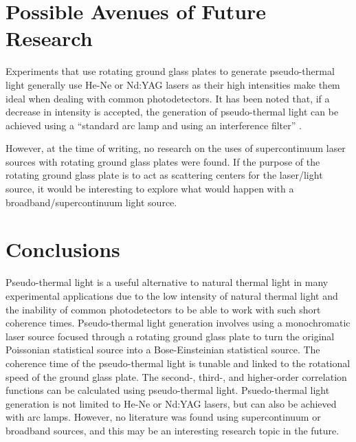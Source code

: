 \documentclass{article}
\begin{document}
\section{Possible Avenues of Future Research}

Experiments that use rotating ground glass plates to generate pseudo-thermal light generally use He-Ne or Nd:YAG lasers as their high intensities make them ideal when dealing with common photodetectors. It has been noted that, if a decrease in intensity is accepted, the generation of pseudo-thermal light can be achieved using a ``standard arc lamp and using an interference filter'' \cite{Spiller2014}.

However, at the time of writing, no research on the uses of supercontinuum laser sources with rotating ground glass plates were found. If the purpose of the rotating ground glass plate is to act as scattering centers for the laser/light source, it would be interesting to explore what would happen with a broadband/supercontinuum light source.

\section{Conclusions}

Pseudo-thermal light is a useful alternative to natural thermal light in many experimental applications due to the low intensity of natural thermal light and the inability of common photodetectors to be able to work with such short coherence times. Pseudo-thermal light generation involves using a monochromatic laser source focused through a rotating ground glass plate to turn the original Poissonian statistical source into a Bose-Einsteinian statistical source. The coherence time of the pseudo-thermal light is tunable and linked to the rotational speed of the ground glass plate. The second-, third-, and higher-order correlation functions can be calculated using pseudo-thermal light. Psuedo-thermal light generation is not limited to He-Ne or Nd:YAG lasers, but can also be achieved with arc lamps. However, no literature was found using supercontinuum or broadband sources, and this may be an interesting research topic in the future.
\end{document}
